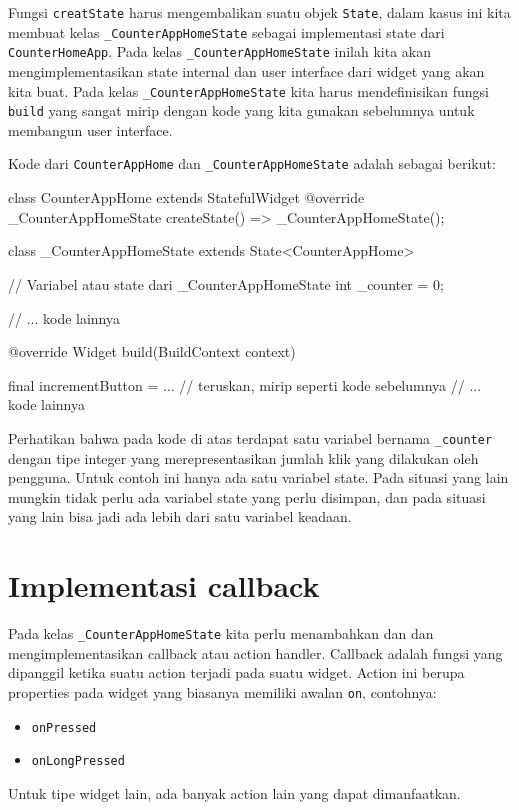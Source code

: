 \documentclass[a4paper,11pt]{article} %
\newcommand{\txtinline}[1]{\texttt{#1}}
\begin{document}
Fungsi \txtinline{creatState} harus mengembalikan suatu objek \txtinline{State},
dalam kasus ini kita membuat kelas \txtinline{_CounterAppHomeState} sebagai
implementasi state dari \txtinline{CounterHomeApp}.
Pada kelas \txtinline{_CounterAppHomeState} inilah kita akan mengimplementasikan
state internal dan user interface dari widget yang akan kita buat.
Pada kelas \txtinline{_CounterAppHomeState} kita harus mendefinisikan
fungsi \txtinline{build} yang sangat mirip dengan kode yang kita gunakan sebelumnya
untuk membangun user interface.

Kode dari \txtinline{CounterAppHome} dan \txtinline{_CounterAppHomeState}
adalah sebagai berikut:
\begin{dartcode}
class CounterAppHome extends StatefulWidget {
  @override
  _CounterAppHomeState createState() => _CounterAppHomeState();
}
  
class _CounterAppHomeState extends State<CounterAppHome> {

  // Variabel atau state dari _CounterAppHomeState
  int _counter = 0;

  // ... kode lainnya

  @override
  Widget build(BuildContext context) {

    final incrementButton = ... // teruskan, mirip seperti kode sebelumnya
    // ... kode lainnya
  }
}
\end{dartcode}

Perhatikan bahwa pada kode di atas terdapat satu variabel bernama
\txtinline{_counter} dengan tipe integer yang merepresentasikan jumlah
klik yang dilakukan oleh pengguna. Untuk contoh ini hanya ada
satu variabel state. Pada situasi yang lain mungkin tidak perlu ada
variabel state yang perlu disimpan, dan pada situasi yang lain
bisa jadi ada lebih dari satu variabel keadaan.


\section{Implementasi callback}

Pada kelas \txtinline{_CounterAppHomeState} kita perlu menambahkan dan
dan mengimplementasikan callback atau action handler.
Callback adalah fungsi yang dipanggil ketika suatu action terjadi
pada suatu widget. Action ini berupa properties pada widget yang
biasanya memiliki awalan \txtinline{on}, contohnya:
\begin{itemize}
\item \txtinline{onPressed}
\item \txtinline{onLongPressed}
\end{itemize}
Untuk tipe widget lain, ada banyak action lain yang dapat dimanfaatkan.
\end{document}
